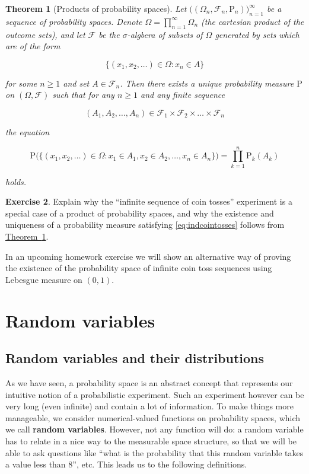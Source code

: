 \documentclass[11pt]{report}
\providecommand{\cal}{\mathcal}
\theoremstyle{plain}
\newtheorem{thm}{Theorem}[chapter]
\theoremstyle{definition}
\newtheorem{xexercise}[thm]{Exercise}
\begin{document}
\begin{thm}[Products of probability spaces]
\label{thm-productspaces}
Let
$\big((\Omega_n, {\cal F}_n,
\mathrm{P}_n)\big)_{n=1}^\infty$
be a sequence of probability spaces. Denote
$\Omega = \prod_{n=1}^\infty \Omega_n$ (the cartesian
product of the outcome sets), and let ${\cal F}$ be
the $\sigma$-algbera of subsets of $\Omega$ generated
by sets which are of the form

\[
\{ (x_1,x_2,\ldots) \in \Omega : x_n \in A \}
\]

\noindent for some $n\ge1$ and set $A \in {\cal F}_n$. Then
there exists a unique probability measure $\mathrm{P}$
on $(\Omega, {\cal F})$ such that for any $n\ge 1$
and any finite sequence

\[
(A_1, A_2, \ldots, A_n) \in {\cal F}_1 \times {\cal F}_2
\times \ldots \times {\cal F}_n
\]

\noindent the equation

\[
\mathrm{P}\Big(\big\{ (x_1,x_2,\ldots ) \in \Omega : x_1\in A_1, x_2 \in A_2, \ldots, x_n \in A_n \big\} \Big)
=
\prod_{k=1}^n \mathrm{P}_k(A_k)
\]

\noindent holds.
\end{thm}

\begin{xexercise}
Explain why the ``infinite sequence of coin tosses''
experiment is a special case of  a product of
probability spaces, and why the existence and
uniqueness of a probability measure satisfying
\eqref{eq:indcointosses} follows from \texorpdfstring{\hyperref[thm-productspaces]{Theorem~\ref*{thm-productspaces}}}{Theorem}.
\end{xexercise}

\noindent In an upcoming homework exercise we will show an
alternative way of proving the existence of the
probability space of infinite coin toss sequences
using Lebesgue measure on $(0,1)$.

\chapter{Random variables}

\section{Random variables and their distributions}

As we have seen, a probability space is an abstract
concept that represents our intuitive notion of a
probabilistic experiment. Such an experiment however
can be very long (even infinite) and contain a lot of
information. To make things more manageable, we
consider numerical-valued functions on probability
spaces, which we call \textbf{random variables}.
However, not any function will do: a random variable
has to relate in a nice way to the measurable space
structure, so that we will be able to ask questions
like ``what is the probability that this random
variable takes a value less than 8'', etc. This leads
us to the following definitions.
\end{document}
